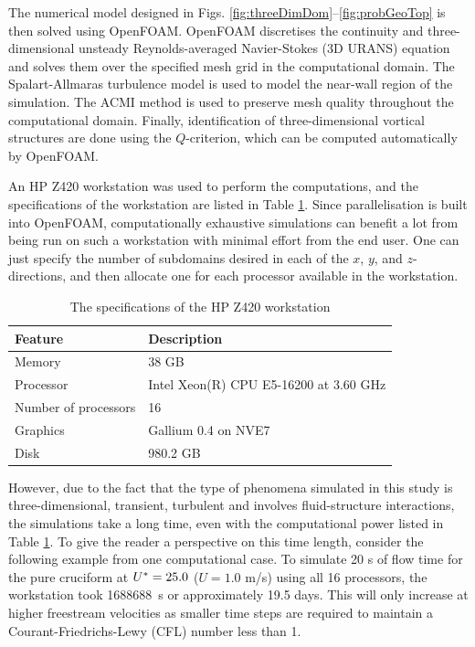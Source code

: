\documentclass[oneside]{utmthesis}
\begin{document}
The numerical model designed in Figs. \ref{fig:threeDimDom}--\ref{fig:probGeoTop} is then solved using OpenFOAM. OpenFOAM discretises the continuity and three-dimensional unsteady Reynolds-averaged Navier-Stokes (3D URANS) equation and solves them over the specified mesh grid in the computational domain. The Spalart-Allmaras turbulence model is used to model the near-wall region of the simulation. The ACMI method is used to preserve mesh quality throughout the computational domain. Finally, identification of three-dimensional vortical structures are done using the $Q$-criterion, which can be computed automatically by OpenFOAM.

An HP Z420 workstation was used to perform the computations, and the specifications of the workstation are listed in Table \ref{tab:workstationSpec}. Since parallelisation is built into OpenFOAM, computationally exhaustive simulations can benefit a lot from being run on such a workstation with minimal effort from the end user. One can just specify the number of subdomains desired in each of the $x$, $y$, and $z$-directions, and then allocate one for each processor available in the workstation.

\begin{table}[!ht]
\centering
\caption{The specifications of the HP Z420 workstation} \label{tab:workstationSpec}
\vspace{\baselineskip}
\begin{tabular}{l l}
  \hline
  \hline

  Feature               & Description                            \\
  \hline

  Memory                & 38 GB                                  \\
  Processor             & Intel Xeon(R) CPU E5-16200 at 3.60 GHz \\
  Number of processors  & 16                                     \\
  Graphics              & Gallium 0.4 on NVE7                    \\
  Disk                  & 980.2 GB                               \\
  \hline
  \hline
\end{tabular}
\end{table}

However, due to the fact that the type of phenomena simulated in this study is three-dimensional, transient, turbulent and involves fluid-structure interactions, the simulations take a long time, even with the computational power listed in Table \ref{tab:workstationSpec}. To give the reader a perspective on this time length, consider the following example from one computational case. To simulate 20 s of flow time for the pure cruciform at $U^{*} = 25.0$ ($U = 1.0$ m/s) using all 16 processors, the workstation took \SI{1688688}{\second} or approximately 19.5 days. This will only increase at higher freestream velocities as smaller time steps are required to maintain a Courant-Friedrichs-Lewy (CFL) number less than 1.
\end{document}
